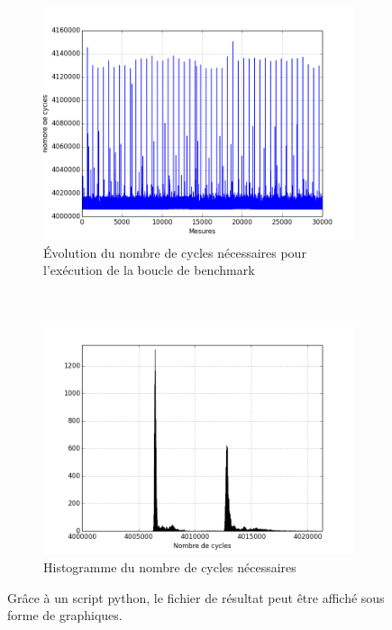         \begin{figure}
            \centering
            \begin{subfigure}[b]{0.45\linewidth}
                \includegraphics[width=\linewidth]{images/kg_plot.png}
                \caption{Évolution du nombre de cycles nécessaires pour l'exécution de la boucle de benchmark}
                \label{pic_kg_plot}
            \end{subfigure}
            ~ %
            \begin{subfigure}[b]{0.45\linewidth}
                \includegraphics[width=\linewidth]{images/kg_hist.png}
                \caption{Histogramme du nombre de cycles nécessaires}
                \label{pic_kg_hist}
            \end{subfigure}
            \caption{Grâce à un script python, le fichier de résultat peut être affiché sous forme de graphiques. }\label{fig:kg_graph}
        \end{figure}
    
